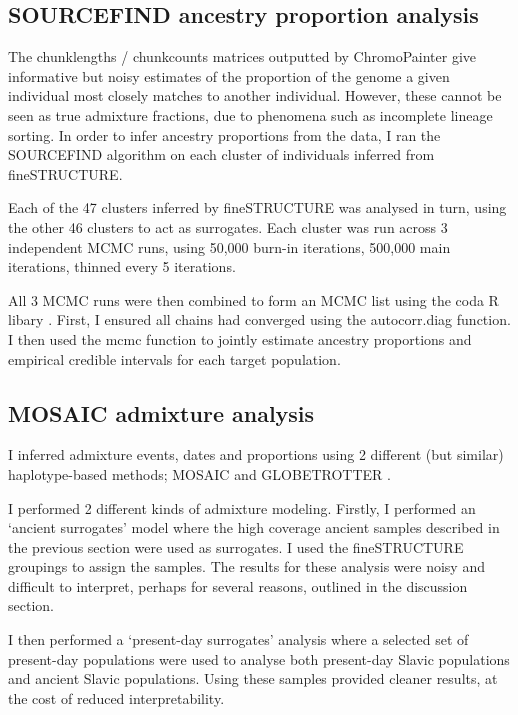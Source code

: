 \subsection{SOURCEFIND ancestry proportion analysis}

The chunklengths / chunkcounts matrices outputted by ChromoPainter give informative but noisy estimates of the proportion of the genome a given individual most closely matches to another individual. However, these cannot be seen as true admixture fractions, due to phenomena such as incomplete lineage sorting. In order to infer ancestry proportions from the data, I ran the SOURCEFIND algorithm \cite{Chacon-Duque2018} on each cluster of individuals inferred from fineSTRUCTURE.

Each of the 47 clusters inferred by fineSTRUCTURE was analysed in turn, using the other 46 clusters to act as surrogates. Each cluster was run across 3 independent MCMC runs, using 50,000 burn-in iterations, 500,000 main iterations, thinned every 5 iterations. 

All 3 MCMC runs were then combined to form an MCMC list using the coda R libary \cite{oro22547}. First, I ensured all chains had converged using the autocorr.diag function. I then used the mcmc function to jointly estimate ancestry proportions and empirical credible intervals for each target population. 

\subsection{MOSAIC admixture analysis}

I inferred admixture events, dates and proportions using 2 different (but similar) haplotype-based methods; MOSAIC \cite{MOSAIC_2019} and GLOBETROTTER \cite{Hellenthal2014}. 

I performed 2 different kinds of admixture modeling. Firstly, I performed an `ancient surrogates' model where the high coverage ancient samples described in the previous section were used as surrogates. I used the fineSTRUCTURE groupings to assign the samples. The results for these analysis were noisy and difficult to interpret,  perhaps for several reasons, outlined in the discussion section. 

I then performed a `present-day surrogates' analysis where a selected set of present-day populations were used to analyse both present-day Slavic populations and ancient Slavic populations. Using these samples provided cleaner results, at the cost of reduced interpretability. 

